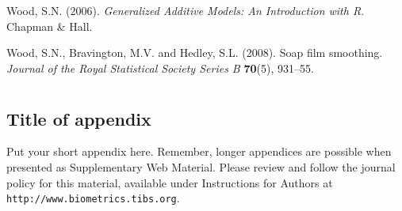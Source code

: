 \documentclass[useAMS,referee]{biom}
\begin{document}
\begin{thebibliography}{}
\bibitem{} Wood, S.N. (2006). \textit{Generalized Additive Models: An Introduction with R}. Chapman \& Hall.


\bibitem{} Wood, S.N., Bravington, M.V. and Hedley, S.L. (2008). Soap film smoothing. \textit{Journal of the Royal Statistical Society Series B} \textbf{70}(5), 931--55.


\end{thebibliography}

\appendix


\section{}
\subsection{Title of appendix}

Put your short appendix here.  Remember, longer appendices are
possible when presented as Supplementary Web Material.  Please 
review and follow the journal policy for this material, available
under Instructions for Authors at \texttt{http://www.biometrics.tibs.org}.

\label{lastpage}
\end{document}
